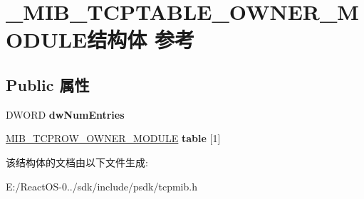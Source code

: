 \hypertarget{struct___m_i_b___t_c_p_t_a_b_l_e___o_w_n_e_r___m_o_d_u_l_e}{}\section{\+\_\+\+M\+I\+B\+\_\+\+T\+C\+P\+T\+A\+B\+L\+E\+\_\+\+O\+W\+N\+E\+R\+\_\+\+M\+O\+D\+U\+L\+E结构体 参考}
\label{struct___m_i_b___t_c_p_t_a_b_l_e___o_w_n_e_r___m_o_d_u_l_e}
\subsection*{Public 属性}
\begin{DoxyCompactItemize}
\item 
\mbox{\label{struct___m_i_b___t_c_p_t_a_b_l_e___o_w_n_e_r___m_o_d_u_l_e_a76f027c35c286b649c202fa4e7587f22}} 
D\+W\+O\+RD {\bfseries dw\+Num\+Entries}
\item 
\mbox{\label{struct___m_i_b___t_c_p_t_a_b_l_e___o_w_n_e_r___m_o_d_u_l_e_aa85a610eebf9b69e71c5ec91131e2c32}} 
\hyperlink{struct___m_i_b___t_c_p_r_o_w___o_w_n_e_r___m_o_d_u_l_e}{M\+I\+B\+\_\+\+T\+C\+P\+R\+O\+W\+\_\+\+O\+W\+N\+E\+R\+\_\+\+M\+O\+D\+U\+LE} {\bfseries table} \mbox{[}1\mbox{]}
\end{DoxyCompactItemize}


该结构体的文档由以下文件生成\+:\begin{DoxyCompactItemize}
\item 
E\+:/\+React\+O\+S-\/0../sdk/include/psdk/tcpmib.\+h\end{DoxyCompactItemize}
